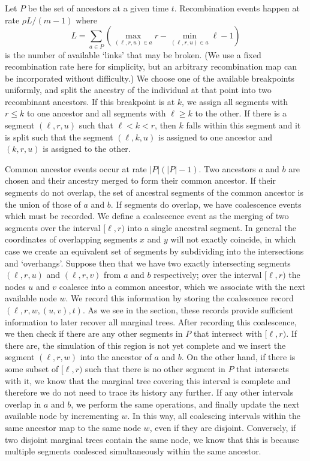 \documentclass[10pt,letterpaper]{article}
\begin{document}
Let $P$ be the set of ancestors at a given time $t$. Recombination events
happen at rate $\rho L / (m - 1)$ where
\[
L = \sum_{a \in P}\left( \max_{(\ell, r, u) \in a}r
    - \min_{(\ell, r, u) \in a}\ell - 1 \right)
\]
is the number of available `links' that may be broken. (We use a fixed
recombination rate here for simplicity, but an arbitrary recombination
map can be incorporated without difficulty.) We choose one of the
available breakpoints uniformly, and split the ancestry of the individual at that point
into two recombinant ancestors. If this breakpoint is at $k$, we assign all
segments with $r \leq k$ to one ancestor and all segments with $\ell \geq k$ to
the other. If there is a segment $(\ell, r, u)$ such that $\ell < k < r$,
then $k$ falls within this segment and it is split
such that the segment $(\ell, k, u)$ is assigned to one ancestor and
$(k, r, u)$ is assigned to the other.

Common ancestor events occur at rate $|P|(|P| - 1)$. Two ancestors $a$ and $b$
are chosen and their ancestry merged to form their common ancestor. If their
segments do not overlap, the set of ancestral segments of the common ancestor is
the union of those of $a$ and $b$. If segments do overlap, we have coalescence
events which must be recorded. We define a coalescence event as the merging of two
segments over the interval $[\ell, r)$ into a single ancestral segment. In
general the coordinates of overlapping segments $x$ and $y$ will not exactly
coincide, in which case we create an equivalent set of segments by
subdividing into the intersections and `overhangs'. Suppose then that we
have two exactly intersecting segments $(\ell, r, u)$ and $(\ell, r, v)$ from $a$ and $b$
respectively; over the interval $[\ell, r)$ the nodes $u$ and $v$ coalesce into
a common ancestor, which we associate with the next available node $w$. We
record this information by storing the coalescence record $\left(\ell, r, w,
(u, v), t\right)$. As we see in the \textbf{}
section, these
records provide sufficient information to later recover all marginal trees.
After recording this coalescence, we then check if there are any other segments
in $P$ that intersect with $[\ell, r)$. If there are, the simulation of this
region is not yet complete and we insert the segment $(\ell, r, w)$ into the
ancestor of $a$ and $b$. On the other hand, if there is some subset of $[\ell,
r)$ such that there is no other segment in $P$ that intersects with it,
 we know that the marginal
tree covering this interval is complete and therefore we do not need to trace
its history any further. If any other intervals overlap in $a$ and $b$, we
perform the same operations, and finally update the next available node by
incrementing $w$. In this way, all coalescing intervals within the same
ancestor map to the same node $w$, even if they are disjoint. Conversely, if
two  disjoint marginal trees contain the same node, we know that this is
because multiple segments coalesced simultaneously within the same ancestor.
\end{document}

